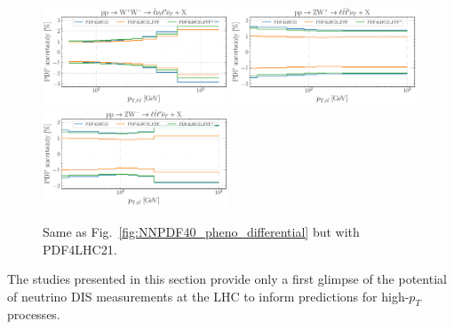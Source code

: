 \begin{figure}[htbp]
	\includegraphics[width=0.49\textwidth]{plots/LHCpheno/NNPDF_WPWM_14TEV_40_PHENO-global-pdf4lhc21.pdf}
	\includegraphics[width=0.49\textwidth]{plots/LHCpheno/NNPDF_WPZ_14TEV_40_PHENO-global-pdf4lhc21.pdf}
	\includegraphics[width=0.49\textwidth]{plots/LHCpheno/NNPDF_WMZ_14TEV_40_PHENO-global-pdf4lhc21.pdf}
	\caption{
		Same as Fig.~\ref{fig:NNPDF40_pheno_differential} but with PDF4LHC21.
	}
	\label{fig:PDF4LHC21_pheno_differential}
\end{figure}

The studies presented in this section provide only a first glimpse of the potential
of neutrino DIS measurements at the LHC to inform predictions for high-$p_T$ processes.


